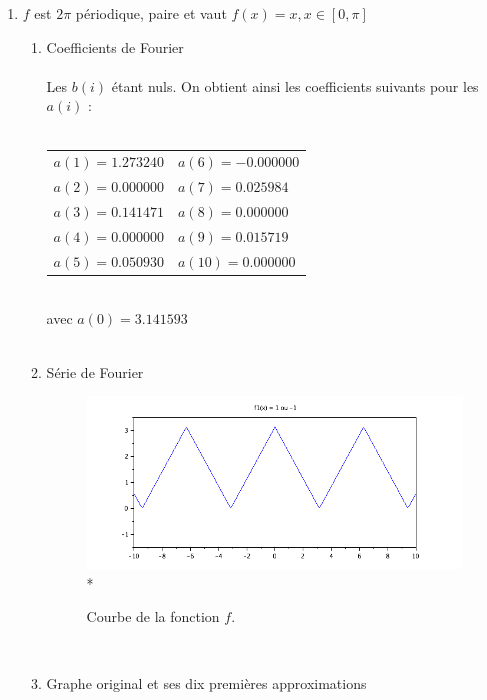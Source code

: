 \documentclass[a4paper,12pt]{report}
\begin{document}
\begin{enumerate}
		\item $f$ est $2\pi$ p\'eriodique, paire et vaut $f(x)=x, x \in [0,\pi]$ \\
		\begin{enumerate}
			\item Coefficients de Fourier \\ \\
			Les $b(i)$ \'etant nuls. On obtient ainsi les coefficients suivants pour les $a(i)$ : \\ \\
			\begin{tabular}{l l}
				$a(1) = 1.273240$ & \hspace*{2cm}$a(6) = -0.000000$\\
				$a(2) = 0.000000$ & \hspace*{2cm}$a(7) = 0.025984$\\
				$a(3) = 0.141471$ & \hspace*{2cm}$a(8) = 0.000000$\\
				$a(4) = 0.000000$ & \hspace*{2cm}$a(9) = 0.015719$\\
				$a(5) = 0.050930$ & \hspace*{2cm}$a(10) = 0.000000$\\
			\end{tabular}\\
			avec $a(0) = 3.141593$\\ \\
			\item S\'erie de Fourier
			\begin{figure}[h!]
				\centering
				\includegraphics[scale=0.6]{ex1_fig3_0.png}\\*
				\caption{\label{ex1_figure3_0}Courbe de la fonction $f$.}
			\end{figure}\\
			\newpage
			\item Graphe original et ses dix premi\`eres approximations

\end{enumerate}
\end{enumerate}
\end{document}
